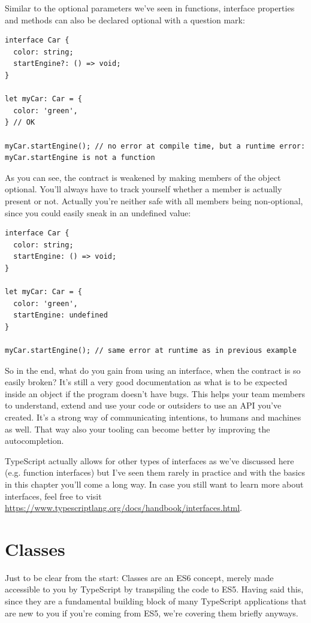 \documentclass[12pt,a4paper]{report}
\begin{document}
Similar to the optional parameters we've seen in functions, interface properties and methods can also be declared optional with a question mark:
\begin{lstlisting}
interface Car {
  color: string;
  startEngine?: () => void;
}

let myCar: Car = {
  color: 'green',
} // OK

myCar.startEngine(); // no error at compile time, but a runtime error: myCar.startEngine is not a function
\end{lstlisting}
As you can see, the contract is weakened by making members of the object optional. You'll always have to track yourself whether a member is actually present or not. Actually you're neither safe with all members being non-optional, since you could easily sneak in an undefined value:
\begin{lstlisting}
interface Car {
  color: string;
  startEngine: () => void;
}

let myCar: Car = {
  color: 'green',
  startEngine: undefined
}

myCar.startEngine(); // same error at runtime as in previous example
\end{lstlisting}
So in the end, what do you gain from using an interface, when the contract is so easily broken? It's still a very good documentation as what is to be expected inside an object if the program doesn't have bugs. This helps your team members to understand, extend and use your code or outsiders to use an API you've created. It's a strong way of communicating intentions, to humans and machines as well. That way also your tooling can become better by improving the autocompletion.

TypeScript actually allows for other types of interfaces as we've discussed here (e.g. function interfaces) but I've seen them rarely in practice and with the basics in this chapter you'll come a long way. In case you still want to learn more about interfaces, feel free to visit \url{https://www.typescriptlang.org/docs/handbook/interfaces.html}.

\section{Classes}

Just to be clear from the start: Classes are an ES6 concept, merely made accessible to you by TypeScript by transpiling the code to ES5. Having said this, since they are a fundamental building block of many TypeScript applications that are new to you if you're coming from ES5, we're covering them briefly anyways.
\end{document}
